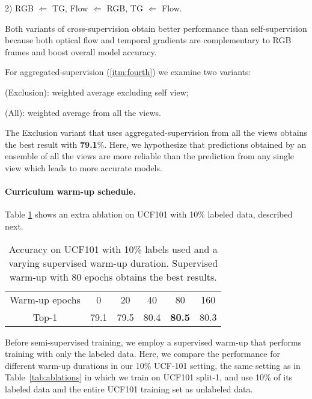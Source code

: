 \documentclass[10pt,twocolumn,letterpaper]{article}
\newcommand{\tablestyle}[2]{\setlength{\tabcolsep}{#1}\renewcommand{\arraystretch}{#2}\centering\footnotesize}
\newcommand{\tblref}[1]{Table~\ref{#1}}
\begin{document}
2) RGB  $\Leftarrow$ TG,  
Flow  $\Leftarrow$ RGB, 
TG  $\Leftarrow$ Flow.

Both variants of cross-supervision obtain better performance than self-supervision because both optical flow and temporal gradients are complementary to RGB frames and boost overall model accuracy. \vspace{2pt} 

\noindent For aggregated-supervision (\ref{itm:fourth}) we  examine two variants:  

(Exclusion): weighted average excluding self view; 

 (All): weighted average from all the views.

The Exclusion variant that uses aggregated-supervision from all the views obtains the best result with \textbf{79.1}\%. 
Here, we hypothesize that predictions obtained by an ensemble of all the views are more reliable than the prediction from any single view which leads to more accurate models. 




\paragraph{Curriculum warm-up schedule.}
{Table} \ref{tab:ab_warm} shows an extra ablation on UCF101 {with 10\% labeled data}, described next.

\begin{table}[h!]
	\centering
	\tablestyle{8pt}{1.3}
	\small
	\begin{tabular}{cccccc}
		Warm-up epochs & 0 & 20 & 40 & 80 & 160  \\
		\shline
		Top-1 &79.1 & 79.5 & 80.4 & \textbf{80.5} & 80.3   \\
	\end{tabular}
	\caption{{Accuracy on UCF101 with 10\% labels used and a varying {supervised} warm-up duration.} {Supervised} warm-up with 80 epochs obtains the best results. }
	\label{tab:ab_warm} 
\end{table}

Before semi-supervised training, we employ a supervised warm-up that performs {training with only }the labeled data. Here, we compare the performance for different warm-up durations in our 10\% UCF-101 setting, \ie the same setting as in \tblref{tab:ablations} in which we train on UCF101 split-1, and use 10\% of its labeled data and the entire UCF101 training set as unlabeled data.
\end{document}
